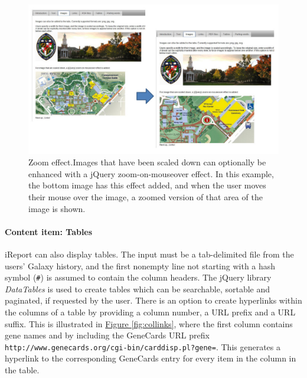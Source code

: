 \begin{figure}[h!]
    \includegraphics[width=\textwidth]{chapters/images/iReport/Hiltemann_zoomeffect.jpg}
    \caption{Zoom effect.Images that have been scaled down can optionally be enhanced with a jQuery zoom-on-mouseover effect. In this example, the bottom image has this effect added, and when the user moves their mouse over the image, a zoomed version of that area of the image is shown. }
    \label{fig:imagezoom}
\end{figure}

\paragraph*{Content item: Tables}
iReport can also display tables. The input must be a tab-delimited file from the users' Galaxy history, and the first nonempty line not starting with a hash symbol (\verb+#+) is assumed to contain the column headers. The jQuery library \emph{DataTables} \cite{url-datatables} is used to create tables which can be searchable, sortable and paginated, if requested by the user. There is an option to create hyperlinks within the columns of a table by providing a column number, a URL prefix and a URL suffix. This is illustrated in \hyperref[fig:collinks]{Figure \ref*{fig:collinks}}, where the first column contains gene names and by including the GeneCards \cite{genecardspaper,url-genecards} URL prefix \verb+http://www.genecards.org/cgi-bin/carddisp.pl?gene=+. This generates a hyperlink to the corresponding GeneCards entry for every item in the column in the table.

